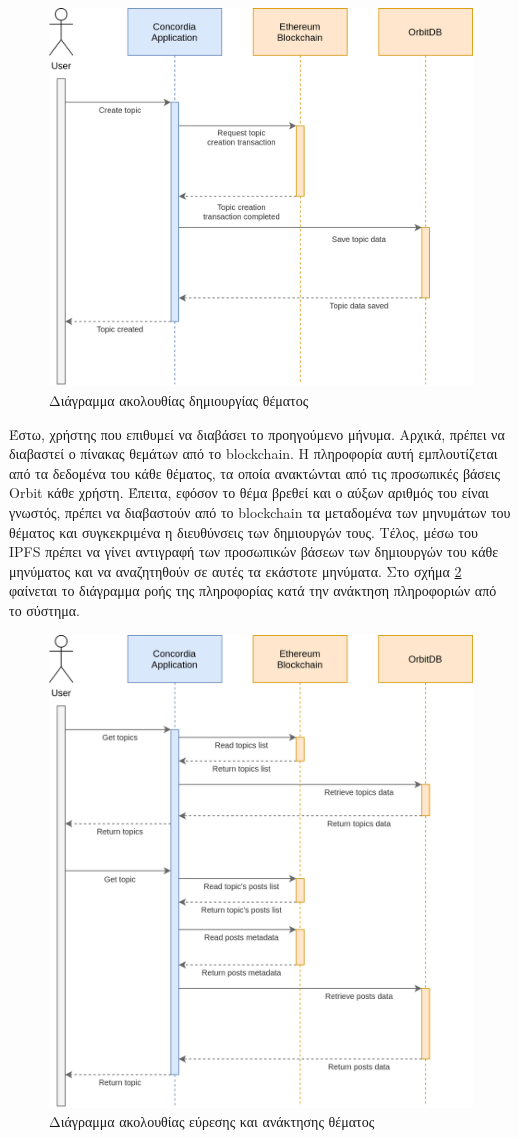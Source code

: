 \begin{figure}[H]
    \centering
    \includegraphics[width=.7\textwidth]{assets/figures/chapter-4/4.3.architecture-4.3.9.data-flow-insert.png}
    \caption{Διάγραμμα ακολουθίας δημιουργίας θέματος}
    \label{figure:4-3-data-flow-insert}
\end{figure}

Έστω, χρήστης που επιθυμεί να διαβάσει το προηγούμενο μήνυμα. Αρχικά, πρέπει να διαβαστεί ο πίνακας θεμάτων από το blockchain. Η πληροφορία αυτή εμπλουτίζεται από τα δεδομένα του κάθε θέματος, τα οποία ανακτώνται από τις προσωπικές βάσεις Orbit κάθε χρήστη. Έπειτα, εφόσον το θέμα βρεθεί και ο αύξων αριθμός του είναι γνωστός, πρέπει να διαβαστούν από το blockchain τα μεταδομένα των μηνυμάτων του θέματος και συγκεκριμένα η διευθύνσεις των δημιουργών τους. Τέλος, μέσω του IPFS πρέπει να γίνει αντιγραφή των προσωπικών βάσεων των δημιουργών του κάθε μηνύματος και να αναζητηθούν σε αυτές τα εκάστοτε μηνύματα. Στο σχήμα \ref{figure:4-3-data-flow-read} φαίνεται το διάγραμμα ροής της πληροφορίας κατά την ανάκτηση πληροφοριών από το σύστημα.

\begin{figure}[H]
    \centering
    \includegraphics[width=.7\textwidth]{assets/figures/chapter-4/4.3.architecture-4.3.9.data-flow-read.png}
    \caption{Διάγραμμα ακολουθίας εύρεσης και ανάκτησης θέματος}
    \label{figure:4-3-data-flow-read}
\end{figure}